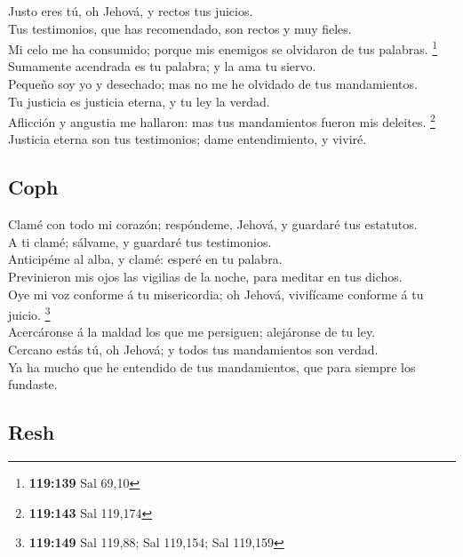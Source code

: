  Justo eres tú, oh Jehová, y rectos tus juicios.\\
 Tus testimonios, que has recomendado, son rectos y muy
fieles.\\
 Mi celo me ha consumido; porque mis enemigos se olvidaron
de tus palabras. \footnote{\textbf{119:139} Sal 69,10}\\
 Sumamente acendrada es tu palabra; y la ama tu siervo.\\
 Pequeño soy yo y desechado; mas no me he olvidado de tus
mandamientos.\\
 Tu justicia es justicia eterna, y tu ley la verdad.\\
 Aflicción y angustia me hallaron: mas tus mandamientos
fueron mis deleites. \footnote{\textbf{119:143} Sal 119,174}\\
 Justicia eterna son tus testimonios; dame entendimiento,
y viviré.

\hypertarget{coph}{%
\subsection{Coph}\label{coph}}

 Clamé con todo mi corazón; respóndeme, Jehová, y guardaré
tus estatutos.\\
 A ti clamé; sálvame, y guardaré tus testimonios.\\
 Anticipéme al alba, y clamé: esperé en tu palabra.\\
 Previnieron mis ojos las vigilias de la noche, para
meditar en tus dichos.\\
 Oye mi voz conforme á tu misericordia; oh Jehová,
vivifícame conforme á tu juicio. \footnote{\textbf{119:149} Sal 119,88;
  Sal 119,154; Sal 119,159}\\
 Acercáronse á la maldad los que me persiguen; alejáronse
de tu ley.\\
 Cercano estás tú, oh Jehová; y todos tus mandamientos son
verdad.\\
 Ya ha mucho que he entendido de tus mandamientos, que
para siempre los fundaste.

\hypertarget{resh}{%
\subsection{Resh}\label{resh}}

